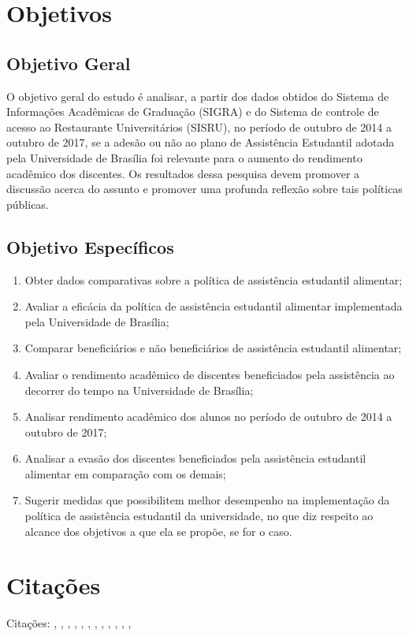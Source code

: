 \section{Objetivos}%

\subsection{Objetivo Geral}
O objetivo geral do estudo é analisar, a partir dos dados obtidos do Sistema de Informações Acadêmicas de Graduação (SIGRA) e do Sistema de controle de acesso ao Restaurante Universitários (SISRU), no período de outubro de 2014 a outubro de 2017, se a adesão ou não ao plano de Assistência Estudantil adotada pela Universidade de Brasília foi relevante para o aumento do rendimento acadêmico dos discentes. Os resultados dessa pesquisa devem promover a discussão acerca do assunto e promover uma profunda reflexão sobre tais políticas públicas.

\subsection{Objetivo Específicos}
\begin{enumerate}
	\item Obter dados comparativas sobre a política de assistência estudantil alimentar;
	\item Avaliar a eficácia da política de assistência estudantil alimentar implementada pela Universidade de Brasília;
	\item Comparar beneficiários e não beneficiários de assistência estudantil alimentar;
	\item Avaliar o rendimento acadêmico de discentes beneficiados pela assistência ao decorrer do tempo na Universidade de Brasília; 
	\item Analisar rendimento acadêmico dos alunos no período de outubro de 2014 a outubro de 2017;
	\item Analisar a evasão dos discentes beneficiados pela assistência estudantil alimentar em comparação com os demais;
	\item Sugerir medidas que possibilitem melhor desempenho na implementação da política de assistência estudantil da universidade, no que diz respeito ao alcance dos objetivos a que ela se propõe, se for o caso.
\end{enumerate}%
\section{Citações}%
   Citações: 
   \cite{Bleicher2016PoliticasFederais},%
   \cite{MarreiroBarbosa2013DESEMPENHOHEMOGLOBINA},%
   \cite{Santos2016ASocial},%
   \cite{Machado2016DireitoUniversitarios},%
   \cite{SilvaMachadoSistemaEducation},%
   \cite{CarolinaLilideAssis2013ASBRASILEIRAS},%
   \cite{VELOSOBARBOSA2015SOBREVIVERBENEFICIARIOS/AS},%
   \cite{HARTMANNLEIBOVICH2015AvaliacaoUnB.},%
   \cite{GuedesdaSilva2017EvasaoInstitucionais.},%
   \cite{SERGIORIBEIROPINHO2017ANALISEFORTALEZA},%
   \cite{FREITASDIASPINHEIRO2015AVALIACAOEDUCACIONAL},%
   \cite{VIEIRADASILVA2016AVALIACAOUnB},%
  

